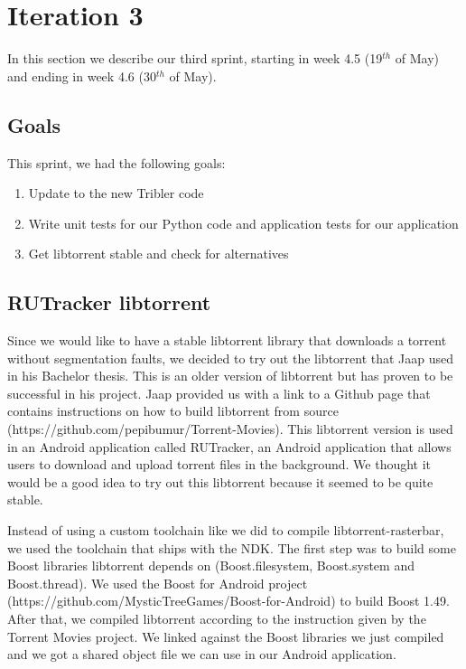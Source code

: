 \section{Iteration 3}
\label{iteration2}
	In this section we describe our third sprint, starting in week 4.5 (19$^{th}$ of May) and ending in week 4.6 (30$^{th}$ of May).

	\subsection{Goals}
		This sprint, we had the following goals:
	
		\begin{enumerate}
			\item Update to the new Tribler code
			\item Write unit tests for our Python code and application tests for our application
			\item Get libtorrent stable and check for alternatives
		\end{enumerate}
		
	\subsection{RUTracker libtorrent}
		Since we would like to have a stable libtorrent library that downloads a torrent without segmentation faults, we decided to try out the libtorrent that Jaap used in his Bachelor thesis. This is an older version of libtorrent but has proven to be successful in his project. Jaap provided us with a link to a Github page that contains instructions on how to build libtorrent from source (https://github.com/pepibumur/Torrent-Movies). This libtorrent version is used in an Android application called RUTracker, an Android application that allows users to download and upload torrent files in the background. We thought it would be a good idea to try out this libtorrent because it seemed to be quite stable.
		
		Instead of using a custom toolchain like we did to compile libtorrent-rasterbar, we used the toolchain that ships with the NDK. The first step was to build some Boost libraries libtorrent depends on (Boost.filesystem, Boost.system and Boost.thread). We used the Boost for Android project (https://github.com/MysticTreeGames/Boost-for-Android) to build Boost 1.49. After that, we compiled libtorrent according to the instruction given by the Torrent Movies project. We linked against the Boost libraries we just compiled and we got a shared object file we can use in our Android application.
		
